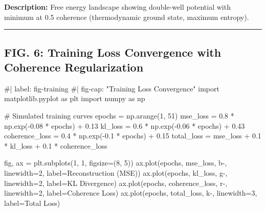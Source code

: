 \documentclass[
  letterpaper,
  DIV=11,
  numbers=noendperiod]{scrartcl}
\newenvironment{Shaded}{\begin{snugshade}}{\end{snugshade}}
\newcommand{\CommentTok}[1]{\textcolor[rgb]{0.37,0.37,0.37}{#1}}
\newcommand{\DecValTok}[1]{\textcolor[rgb]{0.68,0.00,0.00}{#1}}
\newcommand{\FloatTok}[1]{\textcolor[rgb]{0.68,0.00,0.00}{#1}}
\newcommand{\ImportTok}[1]{\textcolor[rgb]{0.00,0.46,0.62}{#1}}
\newcommand{\NormalTok}[1]{\textcolor[rgb]{0.00,0.23,0.31}{#1}}
\newcommand{\OperatorTok}[1]{\textcolor[rgb]{0.37,0.37,0.37}{#1}}
\newcommand{\StringTok}[1]{\textcolor[rgb]{0.13,0.47,0.30}{#1}}
\begin{document}
\textbf{Description:} Free energy landscape showing double-well
potential with minimum at 0.5 coherence (thermodynamic ground state,
maximum entropy).

\begin{center}\rule{0.5\linewidth}{0.5pt}\end{center}

\subsection{FIG. 6: Training Loss Convergence with Coherence
Regularization}\label{fig.-6-training-loss-convergence-with-coherence-regularization}

\begin{Shaded}
\begin{Highlighting}[]
\CommentTok{\#| label: fig{-}training}
\CommentTok{\#| fig{-}cap: "Training Loss Convergence"}
\ImportTok{import}\NormalTok{ matplotlib.pyplot }\ImportTok{as}\NormalTok{ plt}
\ImportTok{import}\NormalTok{ numpy }\ImportTok{as}\NormalTok{ np}

\CommentTok{\# Simulated training curves}
\NormalTok{epochs }\OperatorTok{=}\NormalTok{ np.arange(}\DecValTok{1}\NormalTok{, }\DecValTok{51}\NormalTok{)}
\NormalTok{mse\_loss }\OperatorTok{=} \FloatTok{0.8} \OperatorTok{*}\NormalTok{ np.exp(}\OperatorTok{{-}}\FloatTok{0.08} \OperatorTok{*}\NormalTok{ epochs) }\OperatorTok{+} \FloatTok{0.13}
\NormalTok{kl\_loss }\OperatorTok{=} \FloatTok{0.6} \OperatorTok{*}\NormalTok{ np.exp(}\OperatorTok{{-}}\FloatTok{0.06} \OperatorTok{*}\NormalTok{ epochs) }\OperatorTok{+} \FloatTok{0.43}
\NormalTok{coherence\_loss }\OperatorTok{=} \FloatTok{0.4} \OperatorTok{*}\NormalTok{ np.exp(}\OperatorTok{{-}}\FloatTok{0.1} \OperatorTok{*}\NormalTok{ epochs) }\OperatorTok{+} \FloatTok{0.15}
\NormalTok{total\_loss }\OperatorTok{=}\NormalTok{ mse\_loss }\OperatorTok{+} \FloatTok{0.1} \OperatorTok{*}\NormalTok{ kl\_loss }\OperatorTok{+} \FloatTok{0.1} \OperatorTok{*}\NormalTok{ coherence\_loss}

\NormalTok{fig, ax }\OperatorTok{=}\NormalTok{ plt.subplots(}\DecValTok{1}\NormalTok{, }\DecValTok{1}\NormalTok{, figsize}\OperatorTok{=}\NormalTok{(}\DecValTok{8}\NormalTok{, }\DecValTok{5}\NormalTok{))}
\NormalTok{ax.plot(epochs, mse\_loss, }\StringTok{\textquotesingle{}b{-}\textquotesingle{}}\NormalTok{, linewidth}\OperatorTok{=}\DecValTok{2}\NormalTok{, label}\OperatorTok{=}\StringTok{\textquotesingle{}Reconstruction (MSE)\textquotesingle{}}\NormalTok{)}
\NormalTok{ax.plot(epochs, kl\_loss, }\StringTok{\textquotesingle{}g{-}\textquotesingle{}}\NormalTok{, linewidth}\OperatorTok{=}\DecValTok{2}\NormalTok{, label}\OperatorTok{=}\StringTok{\textquotesingle{}KL Divergence\textquotesingle{}}\NormalTok{)}
\NormalTok{ax.plot(epochs, coherence\_loss, }\StringTok{\textquotesingle{}r{-}\textquotesingle{}}\NormalTok{, linewidth}\OperatorTok{=}\DecValTok{2}\NormalTok{, label}\OperatorTok{=}\StringTok{\textquotesingle{}Coherence Loss\textquotesingle{}}\NormalTok{)}
\NormalTok{ax.plot(epochs, total\_loss, }\StringTok{\textquotesingle{}k{-}\textquotesingle{}}\NormalTok{, linewidth}\OperatorTok{=}\DecValTok{3}\NormalTok{, label}\OperatorTok{=}\StringTok{\textquotesingle{}Total Loss\textquotesingle{}}\NormalTok{)}


\end{Highlighting}
\end{Shaded}
\end{document}
